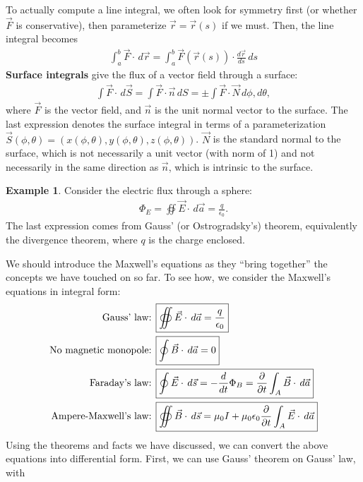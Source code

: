 \documentclass{article}
\theoremstyle{definition}
\newtheorem{exmp}{Example}[section]
\begin{document}
To actually compute a line integral, we often look for symmetry first (or whether $\vec{F}$ is conservative), then parameterize $\vec{r} = \vec{r}(s)$ if we must. Then, the line integral becomes
\begin{align*}
\int_{a}^{b}\vec{F}\cdot\,d\vec{r} = \int_{a}^{b}\vec{F}(\vec{r}(s))\cdot \frac{d\vec{r}}{ds}\,ds
\end{align*}
\textbf{Surface integrals} give the flux of a vector field through a surface:
\begin{align*}
\int \vec{F}\cdot\,d\vec{S} = \int\vec{F}\cdot\vec{n}\,dS = \pm\int\vec{F}\cdot\vec{N}\,d\phi,d\theta,
\end{align*}
where $\vec{F}$ is the vector field, and $\vec{n}$ is the unit normal vector to the surface. The last expression denotes the surface integral in terms of a parameterization $\vec{S}(\phi, \theta) = (x(\phi, \theta),y(\phi, \theta),z(\phi, \theta))$. $\vec{N}$ is the standard normal to the surface, which is not necessarily a unit vector (with norm of 1) and not necessarily in the same direction as $\vec{n}$, which is intrinsic to the surface.
\begin{exmp}
Consider the electric flux through a sphere:
\begin{align*}
\Phi_E = \oiint\vec{E}\cdot\,d\vec{a} = \frac{q}{\epsilon_0}.
\end{align*}
The last expression comes from Gauss' (or Ostrogradsky's) theorem, equivalently the divergence theorem, where $q$ is the charge enclosed.
\end{exmp}
We should introduce the Maxwell's equations as they ``bring together'' the concepts we have touched on so far. To see how, we consider the Maxwell's equations in integral form:
\begin{align*}
\text{Gauss' law:  } \Aboxed{&\oiint\vec{E}\cdot\,d\vec{a} = \frac{q}{\epsilon_0}}\\
\text{No magnetic monopole:  } \Aboxed{&\oint\vec{B}\cdot\,d\vec{a} = 0}\\
\text{Faraday's law:  } 
\Aboxed{&\oint \vec{E}\cdot\,d\vec{s} = -\frac{d}{dt}\Phi_B = \frac{\partial}{\partial t}\int_A\vec{B}\cdot\,d\vec{a}}\\  
\text{Ampere-Maxwell's law:  } 
\Aboxed{&\oiint \vec{B}\cdot\,d\vec{s} = \mu_0I + \mu_0\epsilon_0\frac{\partial}{\partial t}\int_A\vec{E}\cdot\,d\vec{a}}
\end{align*}
Using the theorems and facts we have discussed, we can convert the above equations into differential form. First, we can use Gauss' theorem on Gauss' law, with
\end{document}
